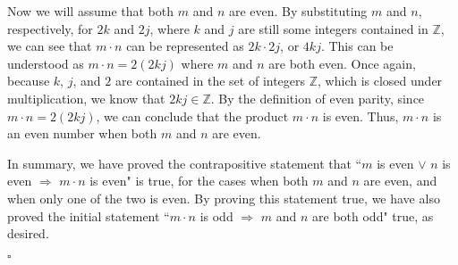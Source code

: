 \documentclass[12pt]{exam}
\begin{document}
\begin{questions}
Now we will assume that both $m$ and $n$ are even. By substituting $m$ and $n$, respectively, for $2k$ and $2j$, where $k$ and $j$ are still some integers contained in $\mathbb Z$, we can see that $m\cdot n$ can be represented as $2k \cdot 2j$, or $4kj$. This can be understood as $m \cdot n = 2(2kj)$ where $m$ and $n$ are both even. Once again,   because $k$, $j$, and $2$ are contained in the set of integers $\mathbb Z$, which is closed under multiplication, we know that $2kj \in \mathbb Z$. By the definition of even parity, since $m \cdot n = 2(2kj)$, we can conclude that the product $m \cdot n$ is even. Thus, $m \cdot n$ is an even number when both $m$ and $n$ are even. 
\par
In summary, we have proved the contrapositive statement that ``$m$ is even $\vee$ $n$ is even $\Rightarrow$ $m\cdot n$ is even" is true, for the cases when both $m$ and $n$ are even, and when only one of the two is even. By proving this statement true, we have also proved the initial statement ``$m\cdot n$ is odd $\Rightarrow$ $m$ and $n$ are both odd" true, as desired.
\begin{flushright}
$\square$
\end{flushright}

\question
{}
\end{questions}
\end{document}
